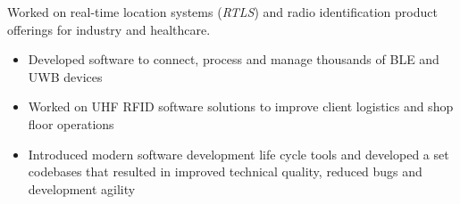 \documentclass[10pt,a4paper,ragged2e,withhyper]{altacv}
\begin{document}
\begin{paracol}{2}
\divider

\medskip


Worked on real-time location systems (\textit{RTLS}) and radio identification product offerings for industry and healthcare.

\medskip

\begin{itemize}
  \item Developed software to connect, process and manage thousands of BLE and UWB devices
  \item Worked on UHF RFID software solutions to improve client logistics and shop floor operations
  \item Introduced modern software development life cycle tools and developed a set codebases that resulted in improved technical quality, reduced bugs and development agility
\end{itemize}













\end{paracol}
\end{document}
